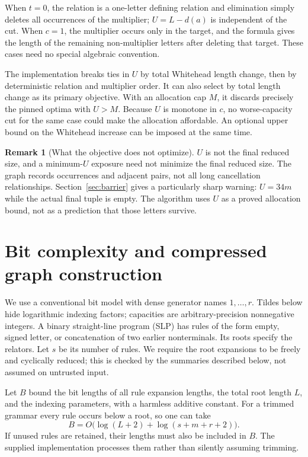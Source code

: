 \documentclass[11pt,letterpaper]{article}
\theoremstyle{definition}\newtheorem{definition}[theorem]{Definition}
\newtheorem{remark}[theorem]{Remark}
\begin{document}
When $t=0$, the relation is a one-letter defining relation and elimination simply deletes all occurrences of the multiplier; $U=L-d(a)$ is independent of the cut. When $c=1$, the multiplier occurs only in the target, and the formula gives the length of the remaining non-multiplier letters after deleting that target. These cases need no special algebraic convention.

The implementation breaks ties in $U$ by total Whitehead length change, then by deterministic relation and multiplier order. It can also select by total length change as its primary objective. With an allocation cap $M$, it discards precisely the pinned optima with $U>M$. Because $U$ is monotone in $c$, no worse-capacity cut for the same case could make the allocation affordable. An optional upper bound on the Whitehead increase can be imposed at the same time.

\begin{remark}[What the objective does not optimize]\label{rem:notactual}
$U$ is not the final reduced size, and a minimum-$U$ exposure need not minimize the final reduced size. The graph records occurrences and adjacent pairs, not all long cancellation relationships. Section~\ref{sec:barrier} gives a particularly sharp warning: $U=34m$ while the actual final tuple is empty. The algorithm uses $U$ as a proved allocation bound, not as a prediction that those letters survive.
\end{remark}

\section{Bit complexity and compressed graph construction}\label{sec:complexity}
We use a conventional bit model with dense generator names $1,\ldots,r$. Tildes below hide logarithmic indexing factors; capacities are arbitrary-precision nonnegative integers. A binary straight-line program (SLP) has rules of the form empty, signed letter, or concatenation of two earlier nonterminals. Its roots specify the relators. Let $s$ be its number of rules. We require the root expansions to be freely and cyclically reduced; this is checked by the summaries described below, not assumed on untrusted input.

Let $B$ bound the bit lengths of all rule expansion lengths, the total root length $L$, and the indexing parameters, with a harmless additive constant. For a trimmed grammar every rule occurs below a root, so one can take
\[
 B=O\bigl(\log(L+2)+\log(s+m+r+2)\bigr).
\]
If unused rules are retained, their lengths must also be included in $B$. The supplied implementation processes them rather than silently assuming trimming.
\end{document}

